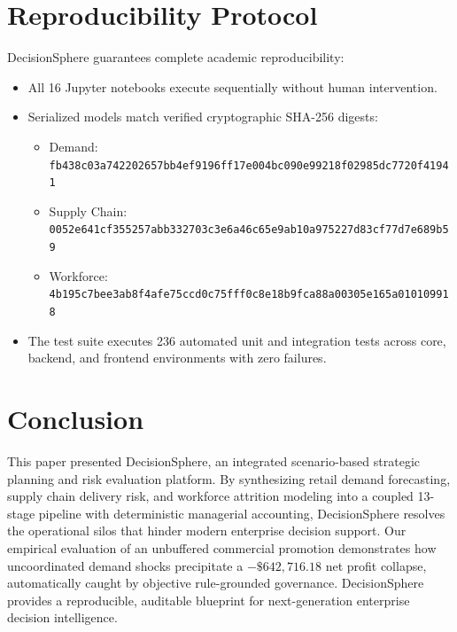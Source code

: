 \documentclass[10pt,conference]{IEEEtran}
\begin{document}
\section{Reproducibility Protocol}

DecisionSphere guarantees complete academic reproducibility:
\begin{itemize}
    \item All 16 Jupyter notebooks execute sequentially without human intervention.
    \item Serialized models match verified cryptographic SHA-256 digests:
    \begin{itemize}
        \item Demand: \texttt{fb438c03a742202657bb4ef9196ff17e004bc090e99218f02985dc7720f41941}
        \item Supply Chain: \texttt{0052e641cf355257abb332703c3e6a46c65e9ab10a975227d83cf77d7e689b59}
        \item Workforce: \texttt{4b195c7bee3ab8f4afe75ccd0c75fff0c8e18b9fca88a00305e165a010109918}
    \end{itemize}
    \item The test suite executes 236 automated unit and integration tests across core, backend, and frontend environments with zero failures.
\end{itemize}

\section{Conclusion}

This paper presented DecisionSphere, an integrated scenario-based strategic planning and risk evaluation platform. By synthesizing retail demand forecasting, supply chain delivery risk, and workforce attrition modeling into a coupled 13-stage pipeline with deterministic managerial accounting, DecisionSphere resolves the operational silos that hinder modern enterprise decision support. Our empirical evaluation of an unbuffered commercial promotion demonstrates how uncoordinated demand shocks precipitate a $-\$642,716.18$ net profit collapse, automatically caught by objective rule-grounded governance. DecisionSphere provides a reproducible, auditable blueprint for next-generation enterprise decision intelligence.



\end{document}
